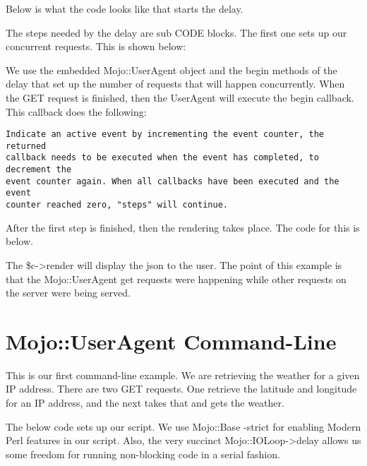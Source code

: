 \documentclass[14pt]{extreport}
\newcommand\Small{\fontsize{12}{13.0}\fontencoding{T1}\selectfont}
\newcommand*\LSTfont{\Small\ttfamily\SetTracking{encoding=*}{-60}\lsstyle}
\begin{document}
Below is what the code looks like that starts the delay.



The steps needed by the delay are sub CODE blocks.  The first one sets up our
concurrent requests.  This is shown below:



We use the embedded Mojo::UserAgent object and the begin methods of the delay
that set up the number of requests that will happen concurrently.  When the GET
request is finished, then the UserAgent will execute the begin callback.  This
callback does the following:

\begin{lstlisting}[style=BlockStyle]
Indicate an active event by incrementing the event counter, the returned
callback needs to be executed when the event has completed, to decrement the
event counter again. When all callbacks have been executed and the event
counter reached zero, "steps" will continue.
\end{lstlisting}

After the first step is finished, then the rendering takes place.  The code for
this is below.



The \$c->render will display the json to the user.  The point of this example
is that the Mojo::UserAgent get requests were happening while other requests on
the server were being served.

\section{Mojo::UserAgent Command-Line}

This is our first command-line example.  We are retrieving the weather for a
given IP address.  There are two GET requests.  One retrieve the latitude and
longitude for an IP address, and the next takes that and gets the weather.

The below code sets up our script.  We use Mojo::Base -strict for enabling
Modern Perl features in our script.  Also, the very succinct
Mojo::IOLoop->delay allows us some freedom for running non-blocking code in a
serial fashion.


\end{document}
